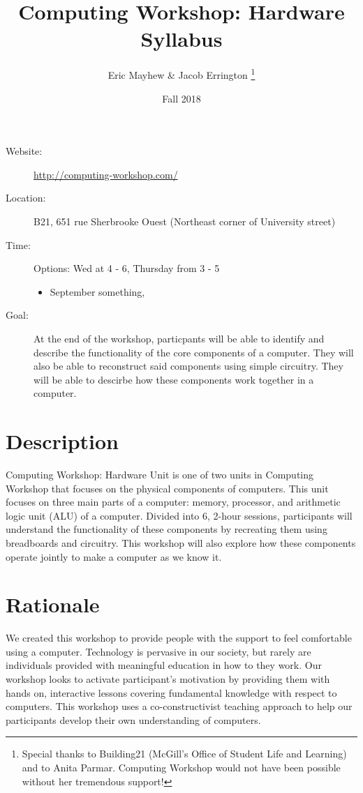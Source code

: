 \documentclass[11pt]{article}
\author{%
  Eric Mayhew \& Jacob Errington%
  \footnote{%
    Special thanks to Building21 (McGill's Office of Student Life and Learning)
    and to Anita Parmar.
    Computing Workshop would not have been possible without her tremendous
    support!
  }
}
\title{Computing Workshop: Hardware Syllabus}
\date{Fall 2018}
\begin{document}
\maketitle

\begin{description}
  \item[Website:]
    \url{http://computing-workshop.com/}

  \item[Location:]
    B21, 651 rue Sherbrooke Ouest
    (Northeast corner of University street)

  \item[Time:]
    Options: Wed at 4 - 6, Thursday from 3 - 5
    \begin{itemize}
      \item September something,
    \end{itemize}

  \item[Goal:]
    At the end of the workshop, particpants will be able to identify and
    describe the functionality of the core components of a computer. They will
    also be able to reconstruct said components using simple circuitry. They
    will be able to descirbe how these components work together in a computer.
\end{description}

\section*{Description}

Computing Workshop: Hardware Unit is one of two units in Computing Workshop that
focuses on the physical components of computers. This unit focuses on three main
parts of a computer: memory, processor, and arithmetic logic unit (ALU) of a
computer. Divided into 6, 2-hour sessions, participants will understand the
functionality of these components by recreating them using breadboards and
circuitry. This workshop will also explore how these components operate jointly
to make a computer as we know it.

\section*{Rationale}

We created this workshop to provide people with the support to feel comfortable
using a computer. Technology is pervasive in our society, but rarely are
individuals provided with meaningful education in how to they work. Our workshop
looks to activate participant's motivation by providing them with hands on,
interactive lessons covering fundamental knowledge with respect to computers.
This workshop uses a co-constructivist teaching approach to help our
participants develop their own understanding of computers.
\end{document}
